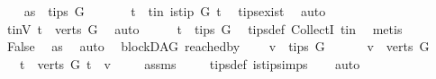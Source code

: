 \begin{isabellebody}
\ \ \isamarkupfalse%
\ as{}{\isacharcolon}{\kern0pt}\ {\isachardoublequoteopen}{\isasymnot}\ tips\ G\ {\isasymnoteq}\ {\isacharbraceleft}{\kern0pt}{\isacharbraceright}{\kern0pt}{\isachardoublequoteclose}\ \isanewline
\ \ \isamarkupfalse%
\ t\ \ t{\isacharunderscore}{\kern0pt}in{\isacharcolon}{\kern0pt}\ {\isachardoublequoteopen}is{\isacharunderscore}{\kern0pt}tip\ G\ t{\isachardoublequoteclose}\ \isamarkupfalse%
\ tips{\isacharunderscore}{\kern0pt}exist\ \isamarkupfalse%
\ auto\isanewline
\ \ \isamarkupfalse%
\ \isamarkupfalse%
\ t{\isacharunderscore}{\kern0pt}inV{\isacharcolon}{\kern0pt}\ {\isachardoublequoteopen}t\ {\isasymin}\ verts\ G{\isachardoublequoteclose}\ \isamarkupfalse%
\ auto\isanewline
\ \ \isamarkupfalse%
\ \isamarkupfalse%
\ {\isachardoublequoteopen}t\ {\isasymin}\ tips\ G{\isachardoublequoteclose}\ \isamarkupfalse%
\ tips{\isacharunderscore}{\kern0pt}def\ CollectI\ t{\isacharunderscore}{\kern0pt}in\ \isamarkupfalse%
\ metis\isanewline
\ \ \isamarkupfalse%
\ \isamarkupfalse%
\ False\ \isamarkupfalse%
\ as{}\ \isamarkupfalse%
\ auto\isanewline
{}\isamarkupfalse%
%
\endisatagproof
{\isafoldproof}%
%
\isadelimproof
\isanewline
%
\endisadelimproof
\isanewline
\isanewline
{}\isamarkupfalse%
\ {\isacharparenleft}{\kern0pt}\ blockDAG{\isacharparenright}{\kern0pt}\ reached{\isacharunderscore}{\kern0pt}by{\isacharcolon}{\kern0pt}\ \isanewline
\ \ \ {\isachardoublequoteopen}v\ {\isasymnotin}\ tips\ G{\isachardoublequoteclose}\isanewline
\ \ \ \ \ \ {\isachardoublequoteopen}v\ {\isasymin}\ verts\ G{\isachardoublequoteclose}\isanewline
\ \ \ {\isachardoublequoteopen}{\isasymexists}t\ {\isasymin}\ verts\ G{\isachardot}{\kern0pt}\ t\ {\isasymrightarrow}\isactrlsup {\isacharplus}{\kern0pt}\ v{\isachardoublequoteclose}\ \isanewline
%
\isadelimproof
\ \ %
\endisadelimproof
%
\isatagproof
{}\isamarkupfalse%
\ assms\ \isanewline
\ \ \isamarkupfalse%
\ tips{\isacharunderscore}{\kern0pt}def\ is{\isacharunderscore}{\kern0pt}tip{\isachardot}{\kern0pt}simps\isanewline
\ \ \isamarkupfalse%
\ auto%
\endisatagproof
{\isafoldproof}%
%
\isadelimproof
\ \isanewline
%
\endisadelimproof
\isanewline
{}\isamarkupfalse%

\end{isabellebody}

